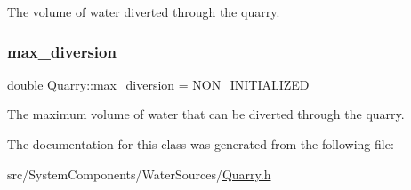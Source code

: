 The volume of water diverted through the quarry. 

\mbox{\label{classQuarry_a5cb60f94475d5991a795cb9117e0b83f}} 
\subsubsection{\texorpdfstring{max\+\_\+diversion}{max\_diversion}}
{\footnotesize\ttfamily double Quarry\+::max\+\_\+diversion = N\+O\+N\+\_\+\+I\+N\+I\+T\+I\+A\+L\+I\+Z\+ED\hspace{0.3cm}{\ttfamily [private]}}



The maximum volume of water that can be diverted through the quarry. 



The documentation for this class was generated from the following file\+:\begin{DoxyCompactItemize}
\item 
src/\+System\+Components/\+Water\+Sources/\mbox{\hyperlink{Quarry_8h}{Quarry.\+h}}\end{DoxyCompactItemize}
